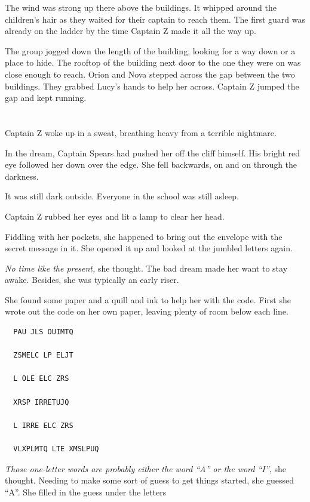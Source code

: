 \documentclass[12pt]{extbook}
\begin{document}
  The wind was strong up there above the buildings. It whipped around the
  children's hair as they waited for their captain to reach them. The
  first guard was already on the ladder by the time Captain Z made it all
  the way up.
  
  The group jogged down the length of the building, looking for a way down
  or a place to hide. The rooftop of the building next door to the one
  they were on was close enough to reach. Orion and Nova stepped across
  the gap between the two buildings. They grabbed Lucy's hands to help her
  across. Captain Z jumped the gap and kept running.
  
  \section{}\label{section-34}
  
  Captain Z woke up in a sweat, breathing heavy from a terrible nightmare.
  
  In the dream, Captain Spears had pushed her off the cliff himself. His
  bright red eye followed her down over the edge. She fell backwards, on
  and on through the darkness.
  
  It was still dark outside. Everyone in the school was still asleep.
  
  Captain Z rubbed her eyes and lit a lamp to clear her head.
  
  Fiddling with her pockets, she happened to bring out the envelope with
  the secret message in it. She opened it up and looked at the jumbled
  letters again.
  
  \emph{No time like the present,} she thought. The bad dream made her
  want to stay awake. Besides, she was typically an early riser.
  
  She found some paper and a quill and ink to help her with the code.
  First she wrote out the code on her own paper, leaving plenty of room
  below each line.
  
  \begin{lstlisting}
  PAU JLS OUIMTQ
  
  ZSMELC LP ELJT
  
  L OLE ELC ZRS
  
  XRSP IRRETUJQ
  
  L IRRE ELC ZRS
  
  VLXPLMTQ LTE XMSLPUQ
  \end{lstlisting}
  
  \emph{Those one-letter words are probably either the word \enquote{A} or
  the word \enquote{I},} she thought. Needing to make some sort of guess
  to get things started, she guessed \enquote{A}. She filled in the guess
  under the letters
  
\end{document}
